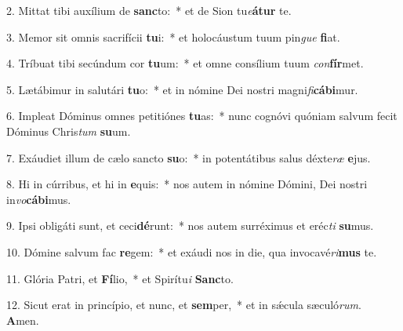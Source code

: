 2. Mittat tibi auxílium de \textbf{sanc}to:~*  et de Sion tu\textit{e}\textbf{á}\textbf{tur} te.\

3. Memor sit omnis sacrifícii \textbf{tu}i:~*  et holocáustum tuum pin\textit{gue} \textbf{fi}at.\

4. Tríbuat tibi secúndum cor \textbf{tu}um:~*  et omne consílium tuum \textit{con}\textbf{fír}met.\

5. Lætábimur in salutári \textbf{tu}o:~*  et in nómine Dei nostri magni\textit{fi}\textbf{cá}\textbf{bi}mur.\

6. Impleat Dóminus omnes petitiónes \textbf{tu}as:~*  nunc cognóvi quóniam salvum fecit Dóminus Chris\textit{tum} \textbf{su}um.\

7. Exáudiet illum de cælo sancto \textbf{su}o:~*  in potentátibus salus déxte\textit{ræ} \textbf{e}jus.\

8. Hi in cúrribus, et hi in \textbf{e}quis:~*  nos autem in nómine Dómini, Dei nostri in\textit{vo}\textbf{cá}\textbf{bi}mus.\

9. Ipsi obligáti sunt, et ceci\textbf{dé}runt:~*  nos autem surréximus et eréc\textit{ti} \textbf{su}mus.\

10. Dómine salvum fac \textbf{re}gem:~*  et exáudi nos in die, qua invocavé\textit{ri}\textbf{mus} te.\

11. Glória Patri, et \textbf{Fí}lio,~*  et Spirítu\textit{i} \textbf{Sanc}to.\

12. Sicut erat in princípio, et nunc, et \textbf{sem}per,~*  et in sǽcula sæculó\textit{rum}. \textbf{A}men.\

